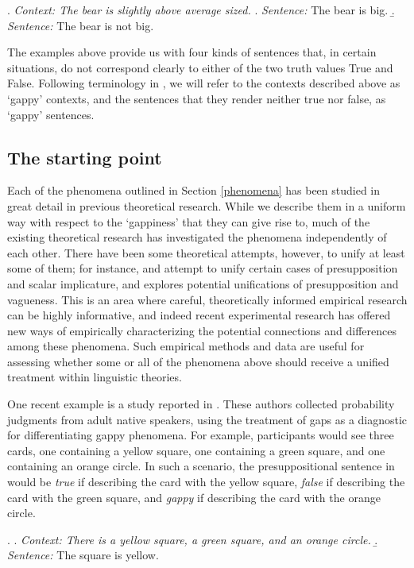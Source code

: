 \documentclass[12pt, letterpaper]{article}
\begin{document}
\ex. \label{vague} \textit{Context: The bear is slightly above average sized.} 
\a. \textit{Sentence:} The bear is big.
\b. \textit{Sentence:} The bear is not big.

The examples above provide us with four kinds of sentences that, in certain situations, do not correspond clearly to either of the two truth values True and False. Following terminology in \cite*{Cremers:2015a}, we will refer to the contexts described above as `gappy' contexts, and the sentences that they render neither true nor false, as `gappy' sentences.

\subsection{The starting point}

Each of the phenomena outlined in Section \ref{phenomena} has been studied in great detail in previous theoretical research. While we describe them in a uniform way with respect to the `gappiness' that they can give rise to, much of the existing theoretical research has investigated the phenomena independently of each other. There have been some theoretical attempts, however, to unify at least some of them; for instance, \cite{Chemla:2009} and \cite{Romoli:2014} attempt to unify certain cases of presupposition and scalar implicature, and \cite{Zehr:2014} explores potential unifications of presupposition and vagueness. This is an area where careful, theoretically informed empirical research can be highly informative, and indeed recent experimental research has offered new ways of empirically characterizing the potential connections and differences among these phenomena. Such empirical methods and data are useful for assessing whether some or all of the phenomena above should receive a unified treatment within linguistic theories.

One recent example is a study reported in \cite*{Cremers:2015a}. These authors collected probability judgments from adult native speakers, using the treatment of gaps as a diagnostic for differentiating gappy phenomena. For example, participants would see three cards, one containing a yellow square, one containing a green square, and one containing an orange circle. In such a scenario, the presuppositional sentence in \Next[b] would be \textit{true} if describing the card with the yellow square, \textit{false} if describing the card with the green square, and \textit{gappy} if describing the card with the orange circle.

\ex. \a. \textit{Context: There is a yellow square, a green square, and an orange circle.} 
\b. \textit{Sentence:} The square is yellow.
\end{document}
